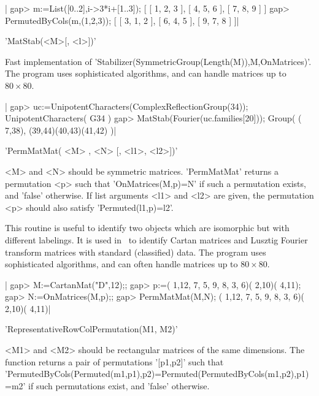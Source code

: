 |    gap> m:=List([0..2],i->3*i+[1..3]);
    [ [ 1, 2, 3 ], [ 4, 5, 6 ], [ 7, 8, 9 ] ]
    gap> PermutedByCols(m,(1,2,3));
    [ [ 3, 1, 2 ], [ 6, 4, 5 ], [ 9, 7, 8 ] ]|

%
%

'MatStab(<M>[, <l>])'

Fast implementation of
'Stabilizer(SymmetricGroup(Length(M)),M,OnMatrices)'.   The   program  uses
sophisticated algorithms, and can handle matrices up to $80\times 80$.

|    gap> uc:=UnipotentCharacters(ComplexReflectionGroup(34));
    UnipotentCharacters( G34 )
    gap> MatStab(Fourier(uc.families[20]));
    Group( ( 7,38), (39,44)(40,43)(41,42) )|

%
%

'PermMatMat( <M> , <N> [, <l1>, <l2>])'

<M>  and  <N>  should  be  symmetric  matrices.  'PermMatMat'  returns a
permutation  <p>  such  that  'OnMatrices(M,p)=N'  if such a permutation
exists,  and  'false'  otherwise.  If  list  arguments <l1> and <l2> are
given, the permutation <p> should also satisfy 'Permuted(l1,p)=l2'.

This  routine is useful to identify two objects which are isomorphic but
with  different labelings.  It is  used in  \CHEVIE\ to  identify Cartan
matrices   and   Lusztig   Fourier   transform  matrices  with  standard
(classified)  data. The  program uses  sophisticated algorithms, and can
often handle matrices up to $80\times 80$.

|    gap> M:=CartanMat("D",12);;
    gap> p:=( 1,12, 7, 5, 9, 8, 3, 6)( 2,10)( 4,11);
    gap> N:=OnMatrices(M,p);;
    gap> PermMatMat(M,N);
    ( 1,12, 7, 5, 9, 8, 3, 6)( 2,10)( 4,11)|

%
%

'RepresentativeRowColPermutation(M1, M2)'

<M1>  and <M2> should  be rectangular matrices  of the same dimensions. The
function returns a pair of permutations '[p1,p2]' such that
'PermutedByCols(Permuted(m1,p1),p2)=Permuted(PermutedByCols(m1,p2),p1)=m2'
if such permutations exist, and 'false' otherwise.

